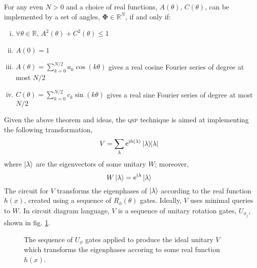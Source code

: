 \documentclass{article}
\begin{document}
\begin{thrm}{\textnormal{\cite{LC17,LC19}}}\label{thrm:1}
    
    \noindent For any even $N>0$ and a choice of real functions, $A(\theta)$, $C(\theta)$, can be implemented by a set of angles, $\boldsymbol{\Phi}\in\mathbb{R}^N$, if and only if:
    \begin{enumerate}[(i)]
        \item $\forall \theta \in \mathbb{R}$, $A^2(\theta) + C^2(\theta)\leq 1$
        \item $A(0) = 1$
        \item $A(\theta) =\displaystyle\sum_{k=0}^{N/2} a_k \cos(k \theta)$ gives a real cosine Fourier series of degree at most $N/2$
        \item $C(\theta) =\displaystyle\sum_{k=0}^{N/2} c_k \sin(k \theta)$ gives a real sine Fourier series of degree at most $N/2$
    \end{enumerate}
\end{thrm}

Given the above theorem and ideas, the \textsc{qsp} technique is aimed at implementing the following transformation,
\begin{equation}\label{eq:v_ideal}
    V = \sum_\lambda \mathrm{e}^{\mathrm{i} h(\lambda)}\ketbra{\lambda}
\end{equation}
where $\ket{\lambda}$ are the eigenvectors of some unitary $W$; moreover,
\begin{equation}
    W\ket{\lambda} = \mathrm{e}^{\mathrm{i} \lambda}\ket{\lambda}
\end{equation}
The circuit for $V$ transforms the eigenphases of $\ket{\lambda}$ according to the real function $h(x)$, created using a sequence of $R_\phi(\theta)$ gates. Ideally, $V$ uses minimal queries to $W$. In circuit diagram language, $V$ is a sequence of unitary rotation gates, $U_{\phi_j}$, shown in fig. \ref{fig:v_ideal}. 

\begin{figure}[!ht]
    \centering
    \caption{The sequence of $U_{\phi}$ gates applied to produce the ideal unitary $V$ which transforms the eigenphases accoring to some real function $h(x)$.}
    \label{fig:v_ideal}
\end{figure}
\end{document}
